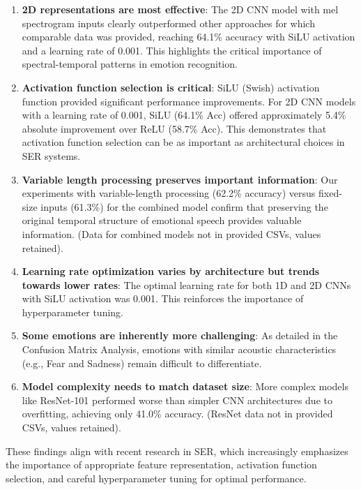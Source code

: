 \begin{enumerate}
    \item \textbf{2D representations are most effective}: The 2D CNN model with mel spectrogram inputs clearly outperformed other approaches for which comparable data was provided, reaching 64.1\% accuracy with SiLU activation and a learning rate of 0.001. This highlights the critical importance of spectral-temporal patterns in emotion recognition.
    
    \item \textbf{Activation function selection is critical}: SiLU (Swish) activation function provided significant performance improvements. For 2D CNN models with a learning rate of 0.001, SiLU (64.1\% Acc) offered approximately 5.4\% absolute improvement over ReLU (58.7\% Acc). This demonstrates that activation function selection can be as important as architectural choices in SER systems.
    
    \item \textbf{Variable length processing preserves important information}: Our experiments with variable-length processing (62.2\% accuracy) versus fixed-size inputs (61.3\%) for the combined model confirm that preserving the original temporal structure of emotional speech provides valuable information. (Data for combined models not in provided CSVs, values retained).
    
    \item \textbf{Learning rate optimization varies by architecture but trends towards lower rates}: The optimal learning rate for both 1D and 2D CNNs with SiLU activation was 0.001. This reinforces the importance of hyperparameter tuning.
    
    \item \textbf{Some emotions are inherently more challenging}: As detailed in the Confusion Matrix Analysis, emotions with similar acoustic characteristics (e.g., Fear and Sadness) remain difficult to differentiate.
    \item \textbf{Model complexity needs to match dataset size}: More complex models like ResNet-101 performed worse than simpler CNN architectures due to overfitting, achieving only 41.0\% accuracy. (ResNet data not in provided CSVs, values retained).
\end{enumerate}

These findings align with recent research in SER, which increasingly emphasizes the importance of appropriate feature representation, activation function selection, and careful hyperparameter tuning for optimal performance.